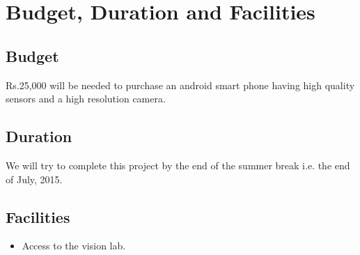 \documentclass{article}
\begin{document}
	\section{Budget, Duration and Facilities}	
		\subsection{Budget}
			Rs.25,000 will be needed to purchase an android smart phone having high quality sensors and a high resolution camera.
		\subsection{Duration}
			We will try to complete this project by the end of the summer break i.e. the end of July, 2015. 
		\subsection{Facilities}
		    \begin{itemize}
		    \item Access to the vision lab.
		    \end{itemize}
\end{document}
